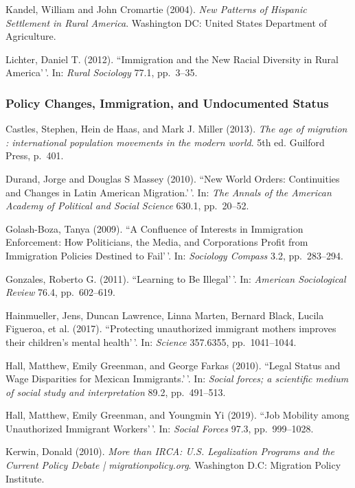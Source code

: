 \documentclass[11pt,]{article}
\begin{document}
Kandel, William and John Cromartie (2004).
\emph{New Patterns of Hispanic Settlement in Rural America}. Washington
DC: United States Department of Agriculture.

Lichter, Daniel T. (2012). ``Immigration and the New Racial Diversity in
Rural America'\,'. In: \emph{Rural Sociology} 77.1, pp.~3--35.

\hypertarget{policy-changes-immigration-and-undocumented-status}{%
\subsubsection{Policy Changes, Immigration, and Undocumented
Status}\label{policy-changes-immigration-and-undocumented-status}}

Castles, Stephen, Hein de Haas, and Mark J. Miller (2013).
\emph{The age of migration : international population movements in the modern world}.
5th ed. Guilford Press, p.~401.

Durand, Jorge and Douglas S Massey (2010). ``New World Orders:
Continuities and Changes in Latin American Migration.'\,'. In:
\emph{The Annals of the American Academy of Political and Social Science}
630.1, pp.~20--52.

Golash-Boza, Tanya (2009). ``A Confluence of Interests in Immigration
Enforcement: How Politicians, the Media, and Corporations Profit from
Immigration Policies Destined to Fail'\,'. In: \emph{Sociology Compass}
3.2, pp.~283--294.

Gonzales, Roberto G. (2011). ``Learning to Be Illegal'\,'. In:
\emph{American Sociological Review} 76.4, pp.~602--619.

Hainmueller, Jens, Duncan Lawrence, Linna Marten, Bernard Black, Lucila
Figueroa, et al. (2017). ``Protecting unauthorized immigrant mothers
improves their children's mental health'\,'. In: \emph{Science}
357.6355, pp.~1041--1044.

Hall, Matthew, Emily Greenman, and George Farkas (2010). ``Legal Status
and Wage Disparities for Mexican Immigrants.'\,'. In:
\emph{Social forces; a scientific medium of social study and interpretation}
89.2, pp.~491--513.

Hall, Matthew, Emily Greenman, and Youngmin Yi (2019). ``Job Mobility
among Unauthorized Immigrant Workers'\,'. In: \emph{Social Forces} 97.3,
pp.~999--1028.

Kerwin, Donald (2010).
\emph{More than IRCA: U.S. Legalization Programs and the Current Policy Debate | migrationpolicy.org}.
Washington D.C: Migration Policy Institute.
\end{document}
